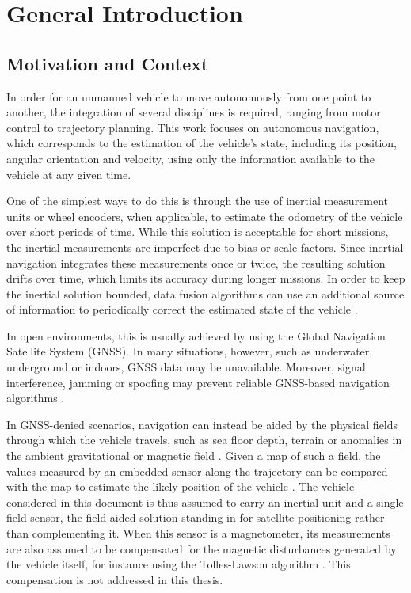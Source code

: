 \chapter{General Introduction}

\section{Motivation and Context}

In order for an unmanned vehicle to move autonomously from one point to another, the integration of several disciplines is required, ranging from motor control to trajectory planning. This work focuses on autonomous navigation, which corresponds to the estimation of the vehicle's state, including its position, angular orientation and velocity, using only the information available to the vehicle at any given time.

One of the simplest ways to do this is through the use of inertial measurement units or wheel encoders, when applicable, to estimate the odometry of the vehicle over short periods of time. While this solution is acceptable for short missions, the inertial measurements are imperfect due to bias or scale factors. Since inertial navigation integrates these measurements once or twice, the resulting solution drifts over time, which limits its accuracy during longer missions. In order to keep the inertial solution bounded, data fusion algorithms can use an additional source of information to periodically correct the estimated state of the vehicle \cite{bib:these-Giremus}.

In open environments, this is usually achieved by using the Global Navigation Satellite System (GNSS). In many situations, however, such as underwater, underground or indoors, GNSS data may be unavailable. Moreover, signal interference, jamming or spoofing may prevent reliable GNSS-based navigation algorithms \cite{bib:GNSS-jamming-spoofing}.

In GNSS-denied scenarios, navigation can instead be aided by the physical fields through which the vehicle travels, such as sea floor depth, terrain or anomalies in the ambient gravitational or magnetic field \cite{bib:MPF-TAN,bib:these-Palmier,bib:bathymetry-gravimetry,bib:magnetic-navigation}. Given a map of such a field, the values measured by an embedded sensor along the trajectory can be compared with the map to estimate the likely position of the vehicle \cite{bib:these-Dahia}. The vehicle considered in this document is thus assumed to carry an inertial unit and a single field sensor, the field-aided solution standing in for satellite positioning rather than complementing it. When this sensor is a magnetometer, its measurements are also assumed to be compensated for the magnetic disturbances generated by the vehicle itself, for instance using the Tolles-Lawson algorithm \cite{bib:Tolles-Lawson}. This compensation is not addressed in this thesis.

